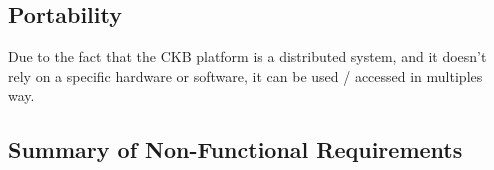 \subsection{Portability}
Due to the fact that the CKB platform is a distributed system, and it doesn't rely on a specific hardware or software, it can be used / accessed in multiples way.\\

{\color{red}\subsection*{Summary of Non-Functional Requirements}}
